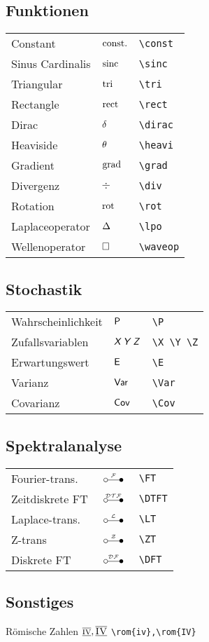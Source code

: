\documentclass[8pt,a5paper]{scrartcl}
\begin{document}
	\subsection{Funktionen}
	\begin{tabular}{lll}
		Constant & $\const$ & \verb#\const#\\
		Sinus Cardinalis & $\sinc$ & \verb#\sinc#\\
		Triangular & $\tri$ & \verb#\tri#\\
		Rectangle & $\rect$ & \verb#\rect#\\
		Dirac & $\dirac$ & \verb#\dirac#\\
		Heaviside & $\heavi$ & \verb#\heavi#\\
		Gradient & $\grad$ & \verb#\grad#\\
		Divergenz & $\div$ & \verb#\div#\\
		Rotation & $\rot$ & \verb#\rot#\\
		Laplaceoperator & $\lpo$ & \verb#\lpo#\\
		Wellenoperator & $\waveop$ & \verb#\waveop#\\
	\end{tabular}


	\subsection{Stochastik}
	\begin{tabular}{lll}
		Wahrscheinlichkeit & $\P$ & \verb#\P#\\
		Zufallsvariablen & $\X \Y \Z$ & \verb#\X \Y \Z#\\
		Erwartungswert & $\E$ & \verb#\E#\\
		Varianz & $\Var$ & \verb#\Var#\\
		Covarianz & $\Cov$ & \verb#\Cov#\\
	\end{tabular}



	\subsection{Spektralanalyse}
	\begin{tabular}{lll}
		Fourier-trans. & $\FT$ & \verb#\FT#\\
		Zeitdiskrete FT & $\DTFT$ & \verb#\DTFT#\\
		Laplace-trans. & $\LT$ & \verb#\LT#\\
		Z-trans & $\ZT$ & \verb#\ZT#\\
		Diskrete FT & $\DFT$ & \verb#\DFT#\\
	\end{tabular}


	\subsection{Sonstiges}
	Römische Zahlen \quad $\rom{iv},\rom{IV}$ \quad \verb#\rom{iv},\rom{IV}#

		
\end{document}
